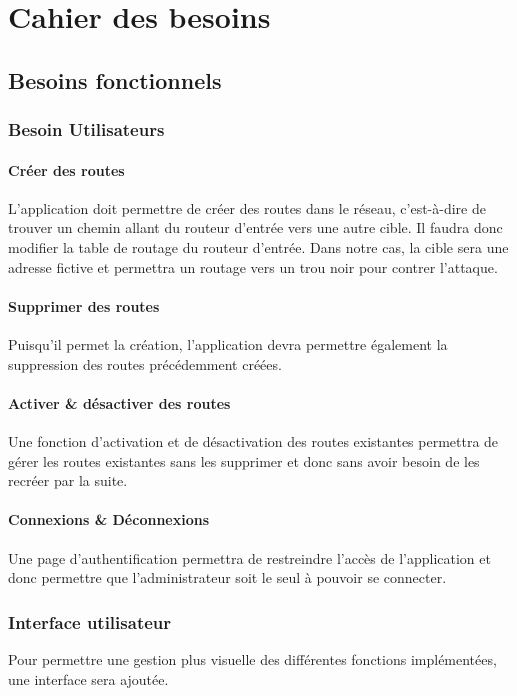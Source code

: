 \chapter{Cahier des besoins}

\section{Besoins fonctionnels}

\subsection{Besoin Utilisateurs}
\subsubsection{Créer des routes}
L'application doit permettre de créer des routes dans le réseau, c'est-à-dire de trouver un chemin allant du routeur d'entrée vers une autre cible. Il faudra donc modifier la table de routage du routeur d'entrée. Dans notre cas, la cible sera une adresse fictive et permettra un routage vers un trou noir pour contrer l'attaque.

\subsubsection{Supprimer des routes}
Puisqu'il permet la création, l'application devra permettre également la suppression des routes précédemment créées.

\subsubsection{Activer \& désactiver des routes}
Une fonction d'activation et de désactivation des routes existantes permettra de gérer les routes existantes sans les supprimer et donc sans avoir besoin de les recréer par la suite.

\subsubsection{Connexions \& Déconnexions}
Une page d'authentification permettra de restreindre l'accès de l'application et donc permettre que l'administrateur soit le seul à pouvoir se connecter.

\subsection{Interface utilisateur}
Pour permettre une gestion plus visuelle des différentes fonctions implémentées, une interface sera ajoutée. %
 
